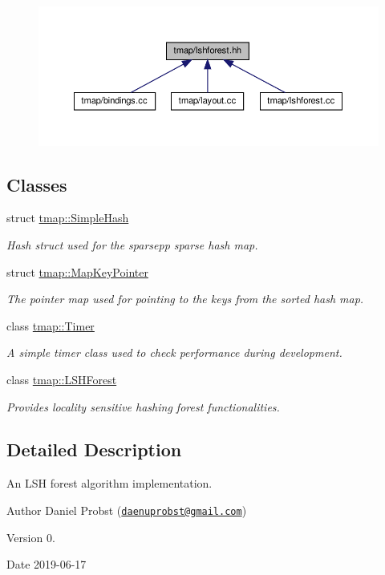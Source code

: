 \begin{figure}[H]
\begin{center}
\leavevmode
\includegraphics[width=350pt]{lshforest_8hh__dep__incl}
\end{center}
\end{figure}
\subsection*{Classes}
\begin{DoxyCompactItemize}
\item 
struct \hyperlink{structtmap_1_1SimpleHash}{tmap\+::\+Simple\+Hash}
\begin{DoxyCompactList}\small\item\em Hash struct used for the sparsepp sparse hash map. \end{DoxyCompactList}\item 
struct \hyperlink{structtmap_1_1MapKeyPointer}{tmap\+::\+Map\+Key\+Pointer}
\begin{DoxyCompactList}\small\item\em The pointer map used for pointing to the keys from the sorted hash map. \end{DoxyCompactList}\item 
class \hyperlink{classtmap_1_1Timer}{tmap\+::\+Timer}
\begin{DoxyCompactList}\small\item\em A simple timer class used to check performance during development. \end{DoxyCompactList}\item 
class \hyperlink{classtmap_1_1LSHForest}{tmap\+::\+L\+S\+H\+Forest}
\begin{DoxyCompactList}\small\item\em Provides locality sensitive hashing forest functionalities. \end{DoxyCompactList}\end{DoxyCompactItemize}


\subsection{Detailed Description}
An L\+SH forest algorithm implementation. 

\begin{DoxyAuthor}{Author}
Daniel Probst (\href{mailto:daenuprobst@gmail.com}{\tt daenuprobst@gmail.\+com}) 
\end{DoxyAuthor}
\begin{DoxyVersion}{Version}
0. 
\end{DoxyVersion}
\begin{DoxyDate}{Date}
2019-\/06-\/17 
\end{DoxyDate}
